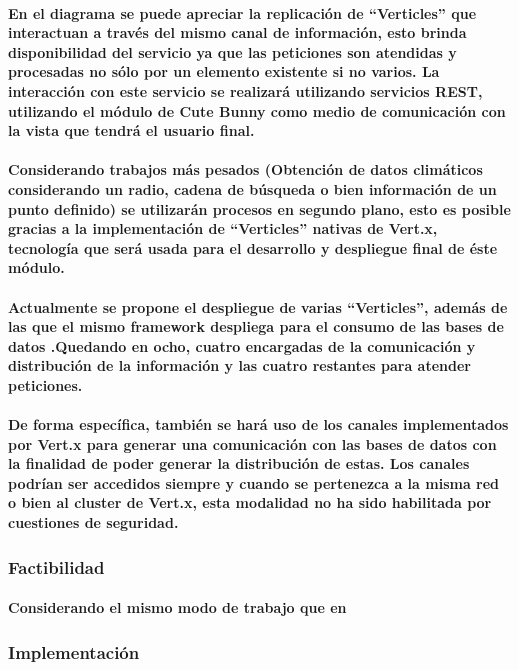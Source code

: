     \paragraph{En el diagrama se puede apreciar la replicación de ``Verticles'' que interactuan a través del mismo canal de información, esto brinda disponibilidad del servicio ya que las peticiones son atendidas y procesadas no sólo por un elemento existente si no varios. La interacción con este servicio se realizará utilizando servicios REST, utilizando el módulo de Cute Bunny como medio de comunicación con la vista que tendrá el usuario final.}
    \paragraph{Considerando trabajos más pesados (Obtención de datos climáticos considerando un radio, cadena de búsqueda o bien información de un punto definido) se utilizarán procesos en segundo plano, esto es posible gracias a la implementación de ``Verticles'' nativas de Vert.x, tecnología que será usada para el desarrollo y despliegue final de éste módulo.}
    \paragraph{Actualmente se propone el despliegue de varias ``Verticles'', además de las que el mismo framework despliega para el consumo de las bases de datos \cite{33}.Quedando en ocho, cuatro encargadas de la comunicación y distribución de la información y las cuatro restantes para atender peticiones.} 
    \paragraph{De forma específica, también se hará uso de los canales implementados por Vert.x para generar una comunicación con las bases de datos con la finalidad de poder generar la distribución de estas. Los canales podrían ser accedidos siempre y cuando se pertenezca a la misma red o bien al cluster de Vert.x, esta modalidad no ha sido habilitada por cuestiones de seguridad.}
  \subsubsection{Factibilidad} 
    \paragraph{Considerando el mismo modo de trabajo que en }
  \subsubsection{Implementación}
